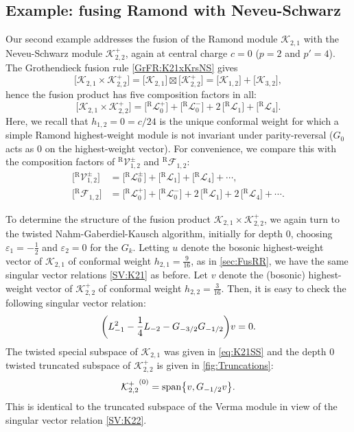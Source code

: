 \documentclass[a4paper,reqno,12pt]{report}
\theoremstyle{definition}
\numberwithin{equation}{section}
\let\originalleft\left     %
\let\originalright\right
\renewcommand{\left}{\mathopen{}\mathclose\bgroup\originalleft}
\renewcommand{\right}{\aftergroup\egroup\originalright}
\newcommand{\brac}[1]{\left( #1 \right)}
\newcommand{\set}[1]{\left\{ #1 \right\}}
\newcommand{\Ver}[1]{\mathcal{V}_{#1}}       %
\newcommand{\Irr}[1]{\mathcal{L}_{#1}}       %
\newcommand{\Kac}[1]{\mathcal{K}_{#1}}       %
\newcommand{\Fock}[1]{\mathcal{F}_{#1}}      %
\newcommand{\Gr}[1]{\bigl[ #1 \bigr]}            %
\newcommand{\fuse}{\mathbin{\times}}                                            %
\newcommand{\Grfuse}{\mathbin{\boxtimes}}                                       %
\newcommand{\hw}{highest-weight}
\newcommand{\sv}{singular vector}
\newcommand{\hwm}{\hw{} module}
\newcommand{\NGK}{Nahm-Gaberdiel-Kausch}
\newcommand{\ns}{Neveu-Schwarz}
\newcommand{\eps}{\varepsilon}
\DeclareMathOperator{\vspn}{span}
\theoremstyle{plain}
\newcommand{\hwv}{\hw{} vector}
\newcommand{\RVer}[1]{{}^{\text{R}}\Ver{#1}}       %
\newcommand{\RIrr}[1]{{}^{\text{R}}\Irr{#1}}       %
\newcommand{\RFock}[1]{{}^{\text{R}}\Fock{#1}}     %
\begin{document}
\subsection{Example:  fusing Ramond with \ns{}} \label{sec:FusNSR}

Our second example addresses the fusion of the Ramond module $\Kac{2,1}$ with the \ns{} module $\Kac{2,2}^+$, again at central charge $c=0$ ($p=2$ and $p'=4$). The Grothendieck fusion rule \eqref{GrFR:K21xKrsNS} gives
\begin{equation}
\Gr{\Kac{2,1} \fuse \Kac{2,2}^+} = \Gr{\Kac{2,1}} \Grfuse \Gr{\Kac{2,2}^+} = \Gr{\Kac{1,2}} + \Gr{\Kac{3,2}},
\end{equation}
hence the fusion product has five composition factors in all:
\begin{equation}
\Gr{\Kac{2,1} \fuse \Kac{2,2}^+} = \Gr{\RIrr{0}^+} + \Gr{\RIrr{0}^-} + 2 \, \Gr{\RIrr{1}} + \Gr{\RIrr{4}}.
\end{equation}
Here, we recall that $h_{1,2} = 0 = c/24$ is the unique conformal weight for which a simple Ramond \hwm{} is not invariant under parity-reversal ($G_0$ acts as $0$ on the \hwv{}).  For convenience, we compare this with the composition factors of $\RVer{1,2}^{\pm}$ and $\RFock{1,2}$:
\begin{equation}
\begin{aligned}
\Gr{\RVer{1,2}^{\pm}} &= \Gr{\RIrr{0}^{\pm}} + \Gr{\RIrr{1}} + \Gr{\RIrr{4}} + \cdots, \\
\Gr{\RFock{1,2}} &= \Gr{\RIrr{0}^+} + \Gr{\RIrr{0}^-} + 2 \, \Gr{\RIrr{1}} + 2 \, \Gr{\RIrr{4}} + \cdots.
\end{aligned}
\end{equation}

To determine the structure of the fusion product $\Kac{2,1} \fuse \Kac{2,2}^+$, we again turn to the twisted \NGK{} algorithm, initially for depth $0$, choosing $\eps_1 = -\frac{1}{2}$ and $\eps_2 = 0$ for the $G_k$.  Letting $u$ denote the bosonic \hwv{} of $\Kac{2,1}$ of conformal weight $h_{2,1} = \frac{9}{16}$, as in \cref{sec:FusRR}, we have the same \sv{} relations \eqref{SV:K21} as before.  Let $v$ denote the (bosonic) \hwv{} of $\Kac{2,2}^+$ of conformal weight $h_{2,2} = \frac{3}{16}$.  Then, it is easy to check the following \sv{} relation:
\begin{equation} \label{SV:K22}
\brac{L_{-1}^2 - \frac{1}{4} L_{-2} - G_{-3/2} G_{-1/2}} v = 0.
\end{equation}
The twisted special subspace of $\Kac{2,1}$ was given in \eqref{eq:K21SS} and the depth $0$ twisted truncated subspace of $\Kac{2,2}^+$ is given in \cref{fig:Truncations}:
\begin{equation}
{\Kac{2,2}^+}^{(0)} = \vspn \set{v, G_{-1/2} v}.
\end{equation}
This is identical to the truncated subspace of the Verma module in view of the \sv{} relation \eqref{SV:K22}.
\end{document}
